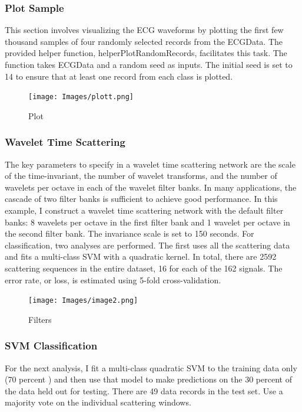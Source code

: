 \documentclass{article}
\begin{document}
\subsubsection{Plot Sample}

This section involves visualizing the ECG waveforms by plotting the first few thousand samples of four randomly selected records from the ECGData. The provided helper function, helperPlotRandomRecords, facilitates this task. The function takes ECGData and a random seed as inputs. The initial seed is set to 14 to ensure that at least one record from each class is plotted.

\begin{figure}
  \centering
  \texttt{[image: Images/plott.png]} %
  \caption{Plot}
  \label{fig:sample}
\end{figure}


\subsubsection{Wavelet Time Scattering}
The key parameters to specify in a wavelet time scattering network are the scale of the time-invariant, the number of wavelet transforms, and the number of wavelets per octave in each of the wavelet filter banks. In many applications, the cascade of two filter banks is sufficient to achieve good performance. In this example, I construct a wavelet time scattering network with the default filter banks: 8 wavelets per octave in the first filter bank and 1 wavelet per octave in the second filter bank. The invariance scale is set to 150 seconds.
For classification, two analyses are performed. The first uses all the scattering data and fits a multi-class SVM with a quadratic kernel. In total, there are 2592 scattering sequences in the entire dataset, 16 for each of the 162 signals. The error rate, or loss, is estimated using 5-fold cross-validation.

\begin{figure}
    \centering
    \texttt{[image: Images/image2.png]}
    \caption{Filters}
    \label{fig:enter-label}
\end{figure}

\subsubsection{SVM Classification}
For the next analysis, I fit a multi-class quadratic SVM to the training data only (70 percent ) and then use that model to make predictions on the 30 percent of the data held out for testing. There are 49 data records in the test set. Use a majority vote on the individual scattering windows.
\end{document}

